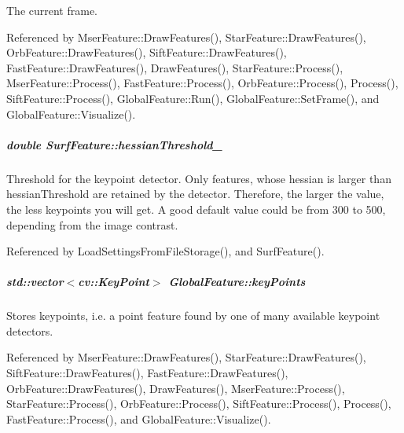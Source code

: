 The current frame. 



Referenced by Mser\-Feature\-::\-Draw\-Features(), Star\-Feature\-::\-Draw\-Features(), Orb\-Feature\-::\-Draw\-Features(), Sift\-Feature\-::\-Draw\-Features(), Fast\-Feature\-::\-Draw\-Features(), Draw\-Features(), Star\-Feature\-::\-Process(), Mser\-Feature\-::\-Process(), Fast\-Feature\-::\-Process(), Orb\-Feature\-::\-Process(), Process(), Sift\-Feature\-::\-Process(), Global\-Feature\-::\-Run(), Global\-Feature\-::\-Set\-Frame(), and Global\-Feature\-::\-Visualize().

\hypertarget{group___feature_extractor_a32db9f77d27527ff7c25824d954e30bc}{
\subparagraph[{hessian\-Threshold\-\_\-}]{\setlength{\rightskip}{0pt plus 5cm}double Surf\-Feature\-::hessian\-Threshold\-\_\-\hspace{0.3cm}{\ttfamily [private]}}}\label{group___feature_extractor_a32db9f77d27527ff7c25824d954e30bc}


Threshold for the keypoint detector. Only features, whose hessian is larger than hessian\-Threshold are retained by the detector. Therefore, the larger the value, the less keypoints you will get. A good default value could be from 300 to 500, depending from the image contrast. 



Referenced by Load\-Settings\-From\-File\-Storage(), and Surf\-Feature().

\hypertarget{group___feature_extractor_a72cc606c0090a64718a7e92bca7520b9}{
\subparagraph[{key\-Points}]{\setlength{\rightskip}{0pt plus 5cm}std\-::vector$<$cv\-::\-Key\-Point$>$ Global\-Feature\-::key\-Points\hspace{0.3cm}{\ttfamily [inherited]}}}\label{group___feature_extractor_a72cc606c0090a64718a7e92bca7520b9}


Stores keypoints, i.\-e. a point feature found by one of many available keypoint detectors. 



Referenced by Mser\-Feature\-::\-Draw\-Features(), Star\-Feature\-::\-Draw\-Features(), Sift\-Feature\-::\-Draw\-Features(), Fast\-Feature\-::\-Draw\-Features(), Orb\-Feature\-::\-Draw\-Features(), Draw\-Features(), Mser\-Feature\-::\-Process(), Star\-Feature\-::\-Process(), Orb\-Feature\-::\-Process(), Sift\-Feature\-::\-Process(), Process(), Fast\-Feature\-::\-Process(), and Global\-Feature\-::\-Visualize().

